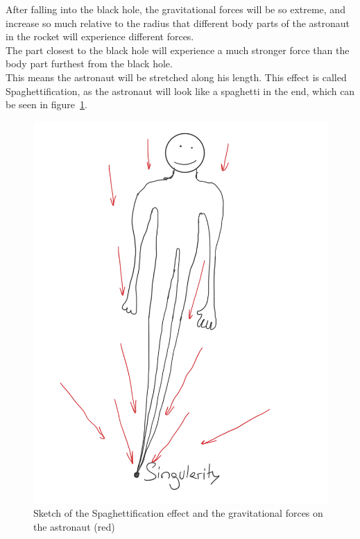 \documentclass[reprint,english,notitlepage]{revtex4-2}
\begin{document}
        After falling into the black hole, the gravitational forces will be so extreme, and increase so much relative to the radius that different body parts of the astronaut in the rocket will experience different forces.\\
        The part closest to the black hole will experience a much stronger force than the body part furthest from the black hole.\\
        This means the astronaut will be stretched along his length.
        This effect is called Spaghettification, as the astronaut will look like a spaghetti in the end, which can be seen in figure~\ref{fig:spaghettification}.

        \begin{figure}[h]
            \centering
            \includegraphics[scale=0.15]{spaghettification}
            \caption{Sketch of the Spaghettification effect and the gravitational forces on the astronaut (red)}\label{fig:spaghettification}
        \end{figure}
\end{document}
